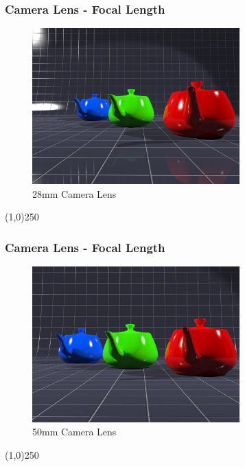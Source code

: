 \begin{frame}
\frametitle{Camera Lens - Focal Length}
\begin{figure}
	\centering
	\includegraphics[height=6cm]{img/Camras/28mm.jpg}
	\caption[28mm Camera Lens]{28mm Camera Lens}
	\label{fig:28mm}
\end{figure}
\end{frame}
\begin{center}\line(1,0){250}\end{center}


\begin{frame}
\frametitle{Camera Lens - Focal Length}
\begin{figure}
	\centering
	\includegraphics[height=6cm]{img/Camras/50mm.jpg}
	\caption[50mm Camera Lens]{50mm Camera Lens}
	\label{fig:50mm}
\end{figure}
\end{frame}
\begin{center}\line(1,0){250}\end{center}



